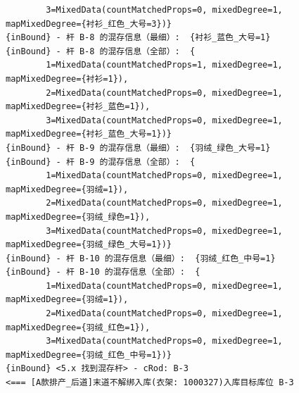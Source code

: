 {\begin{verbatim}
		3=MixedData(countMatchedProps=0, mixedDegree=1, mapMixedDegree={衬衫_红色_大号=3})}
{inBound} - 杆 B-8 的混存信息（最细）:  {衬衫_蓝色_大号=1}
{inBound} - 杆 B-8 的混存信息（全部）:  {
		1=MixedData(countMatchedProps=1, mixedDegree=1, mapMixedDegree={衬衫=1}), 
		2=MixedData(countMatchedProps=0, mixedDegree=1, mapMixedDegree={衬衫_蓝色=1}), 
		3=MixedData(countMatchedProps=0, mixedDegree=1, mapMixedDegree={衬衫_蓝色_大号=1})}
{inBound} - 杆 B-9 的混存信息（最细）:  {羽绒_绿色_大号=1}
{inBound} - 杆 B-9 的混存信息（全部）:  {
		1=MixedData(countMatchedProps=0, mixedDegree=1, mapMixedDegree={羽绒=1}), 
		2=MixedData(countMatchedProps=0, mixedDegree=1, mapMixedDegree={羽绒_绿色=1}), 
		3=MixedData(countMatchedProps=0, mixedDegree=1, mapMixedDegree={羽绒_绿色_大号=1})}
{inBound} - 杆 B-10 的混存信息（最细）:  {羽绒_红色_中号=1}
{inBound} - 杆 B-10 的混存信息（全部）:  {
		1=MixedData(countMatchedProps=0, mixedDegree=1, mapMixedDegree={羽绒=1}), 
		2=MixedData(countMatchedProps=0, mixedDegree=1, mapMixedDegree={羽绒_红色=1}), 
		3=MixedData(countMatchedProps=0, mixedDegree=1, mapMixedDegree={羽绒_红色_中号=1})}
{inBound} <5.x 找到混存杆> - cRod: B-3
<=== [A款排产_后道]末道不解绑入库(衣架: 1000327)入库目标库位 B-3


\end{verbatim}}
